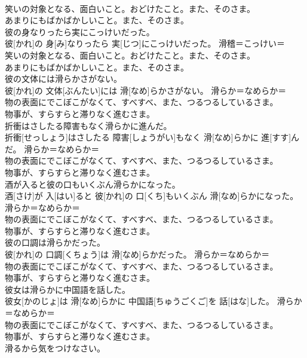 \documentclass[8pt]{extreport}
\begin{document}
\begin{CJK}{UTF8}{min}
{\\	笑いの対象となる、面白いこと。おどけたこと。また、そのさま。 
\\	あまりにもばかばかしいこと。また、そのさま。
\\	彼の身なりったら実にこっけいだった。	
\\	彼[かれ]の 身[み]なりったら 実[じつ]にこっけいだった。	滑稽＝こっけい＝ 
\\	笑いの対象となる、面白いこと。おどけたこと。また、そのさま。 
\\	あまりにもばかばかしいこと。また、そのさま。
\\	彼の文体には滑らかさがない。	
\\	彼[かれ]の 文体[ぶんたい]には 滑[なめ]らかさがない。	滑らか＝なめらか＝ 
\\	物の表面にでこぼこがなくて、すべすべ、また、つるつるしているさま。 
\\	物事が、すらすらと滞りなく進むさま。
\\	折衝はさしたる障害もなく滑らかに進んだ。	
\\	折衝[せっしょう]はさしたる 障害[しょうがい]もなく 滑[なめ]らかに 進[すす]んだ。	滑らか＝なめらか＝ 
\\	物の表面にでこぼこがなくて、すべすべ、また、つるつるしているさま。 
\\	物事が、すらすらと滞りなく進むさま。
\\	酒が入ると彼の口もいくぶん滑らかになった。	
\\	酒[さけ]が 入[はい]ると 彼[かれ]の 口[くち]もいくぶん 滑[なめ]らかになった。	滑らか＝なめらか＝ 
\\	物の表面にでこぼこがなくて、すべすべ、また、つるつるしているさま。 
\\	物事が、すらすらと滞りなく進むさま。
\\	彼の口調は滑らかだった。	
\\	彼[かれ]の 口調[くちょう]は 滑[なめ]らかだった。	滑らか＝なめらか＝ 
\\	物の表面にでこぼこがなくて、すべすべ、また、つるつるしているさま。 
\\	物事が、すらすらと滞りなく進むさま。
\\	彼女は滑らかに中国語を話した。	
\\	彼女[かのじょ]は 滑[なめ]らかに 中国語[ちゅうごくご]を 話[はな]した。	滑らか＝なめらか＝ 
\\	物の表面にでこぼこがなくて、すべすべ、また、つるつるしているさま。 
\\	物事が、すらすらと滞りなく進むさま。
\\	滑るから気をつけなさい。	
}
\end{CJK}
\end{document}
